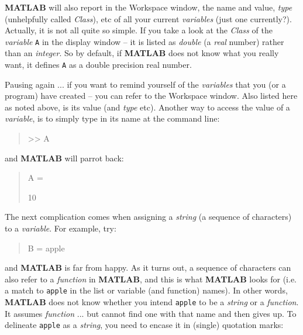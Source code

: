 \documentclass{tufte-book} %
\newenvironment{docspec}{\begin{quotation}\ttfamily\parskip0pt\parindent0pt\ignorespaces}{\end{quotation}}
\begin{document}
\textbf{MATLAB} will also report in the \textsf{Workspace} window, the name and value, \textit{type} (unhelpfully called \textit{Class}), etc of all your current \textit{variables} (just one currently?). Actually, it is not all quite so simple. If you take a look at the \textit{Class} of the \textit{variable} \texttt{A} in the display window -- it is  listed as \textit{double} (a \textit{real} number) rather than an \textit{integer}. So by default, if \textbf{MATLAB} does not know what you really want, it defines \texttt{A} as a double precision real number.

Pausing again ... if you want to remind yourself of the \textit{variables} that you (or a program) have created -- you can refer to the \textsf{Workspace} window. Also listed here as noted above, is its value (and \textit{type} etc). Another way to access the value of a \textit{variable}, is to simply type in its name at the command line:

\begin{docspec}
>> A
\end{docspec}

\noindent and \textbf{MATLAB} will parrot back:

\begin{docspec}
A =

    10
\end{docspec}

The next complication comes when assigning a \textit{string} (a sequence of characters) to a \textit{variable}. For example, try:

\begin{docspec}
B = apple
\end{docspec}

\noindent and \textbf{MATLAB} is far from happy. As it turns out,  a sequence of characters  can also refer to a \textit{function} in \textbf{MATLAB}, and this is what \textbf{MATLAB} looks for (i.e. a match to \texttt{apple} in the list or variable (and function) names). In other words, \textbf{MATLAB} does not know whether you intend \texttt{apple} to be a \textit{string} or a \textit{function}. It assumes \textit{function} ... but cannot find one with that name and then gives up. To delineate \texttt{apple} as a \textit{string}, you need to encase it in (single) quotation marks:
\end{document}
